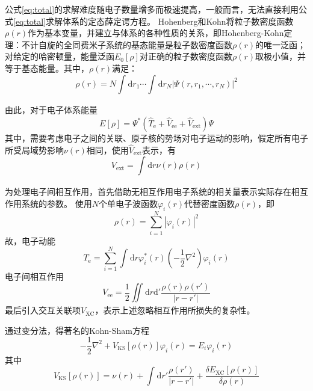 公式\ref{eq:total}的求解难度随电子数量增多而极速提高，一般而言，无法直接利用公式\ref{eq:total}求解体系的定态薛定谔方程。
Hohenberg和Kohn将粒子数密度函数$\rho(r)$作为基本变量，并建立与体系的各种性质的关系，即Hohenberg-Kohn定理：不计自旋的全同费米子系统的基态能量是粒子数密度函数$\rho(r)$的唯一泛函；对给定的哈密顿量，能量泛函$E_0[\rho]$对正确的粒子数密度函数$\rho(r)$取极小值，并等于基态能量。其中，$\rho(r)$满足：
\begin{equation}
    \rho(r)=N\int_{}^{}\mathrm{d}r_1 \cdots \int_{}^{}\mathrm{d}r_N | \varPsi (r,r_1,\cdots,r_N) |^2
\end{equation}

由此，对于电子体系能量
\begin{equation}
    E[\rho] = \varPsi ^*(\hat{T}_{\mathrm{e}}+\hat{V}_{\mathrm{ee}}+\hat{V}_{\mathrm{ext}})\varPsi
\end{equation}
其中，需要考虑电子之间的关联、原子核的势场对电子运动的影响，假定所有电子所受局域势影响$\nu(r)$相同，使用$\hat{V}_{\mathrm{ext}}$表示，有
\begin{equation}
    V_{\mathrm{ext}} = \int_{}^{}\mathrm{d}r\nu(r)\rho(r)
\end{equation}

为处理电子间相互作用，首先借助无相互作用电子系统的相关量表示实际存在相互作用系统的参数。
使用$N$个单电子波函数$ \varphi _i(r) $代替密度函数$\rho(r)$，即
\begin{equation}
    \rho(r)=\sum_{i=1}^{N}|\varphi_i (r)|^2
\end{equation}
故，电子动能
\begin{equation}
    T_{\mathrm{e}}=\sum_{i=1}^{N}\int_{}^{}\mathrm{d}r\varphi^*_i(r)(-\frac{1}{2}\nabla^2)\varphi_i(r)
\end{equation}
电子间相互作用
\begin{equation}
    V_{\mathrm{ee}} =\frac{1}{2}\iint_{}^{}\mathrm{d}r\mathrm{d'}\frac{\rho(r)\rho(r')}{|r-r'|}
\end{equation}
最后引入交互关联项$V_{\mathrm{XC}}$，表示上述忽略相互作用所损失的复杂性。

通过变分法，得著名的Kohn-Sham方程
\begin{equation}
    {-\frac{1}{2}\nabla^2+V_{\mathrm{KS}}[\rho(r)]}\varphi_i(r)=E_i\varphi_i(r)
\end{equation}
其中
\begin{equation}
    V_{\mathrm{KS}}[\rho(r)]=\nu(r)+\int_{}^{}\mathrm{d}r'\frac{\rho(r')}{|r-r'|}+\frac{\delta E_{\mathrm{XC}}[\rho(r)]}{\delta\rho(r)}
\end{equation}

